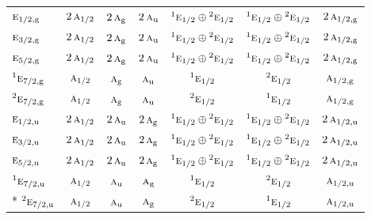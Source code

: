\documentclass[10pt,a4paper]{article}
\numberwithin{equation}{section}
\newcommand{\irr}[1]{\text{\normalfont\scshape #1}}
\newcommand{\conjpair}[1]{{}^{#1}}
\newcommand{\ptag}[1]{\mathrm{#1}}
\begin{document}
{\begin{longtable}{@{}lcccccc@{}}
$\irr{e}_{1/2,\ptag{g}}$ & $2\,\irr{a}_{1/2}$ & $2\,\irr{a}_{\ptag{g}}$ & $2\,\irr{a}_{\ptag{u}}$ & $\conjpair{1}\irr{e}_{1/2}\oplus \conjpair{2}\irr{e}_{1/2}$ & $\conjpair{1}\irr{e}_{1/2}\oplus \conjpair{2}\irr{e}_{1/2}$ & $2\,\irr{a}_{1/2,\ptag{g}}$\\
$\irr{e}_{3/2,\ptag{g}}$ & $2\,\irr{a}_{1/2}$ & $2\,\irr{a}_{\ptag{g}}$ & $2\,\irr{a}_{\ptag{u}}$ & $\conjpair{1}\irr{e}_{1/2}\oplus \conjpair{2}\irr{e}_{1/2}$ & $\conjpair{1}\irr{e}_{1/2}\oplus \conjpair{2}\irr{e}_{1/2}$ & $2\,\irr{a}_{1/2,\ptag{g}}$\\
$\irr{e}_{5/2,\ptag{g}}$ & $2\,\irr{a}_{1/2}$ & $2\,\irr{a}_{\ptag{g}}$ & $2\,\irr{a}_{\ptag{u}}$ & $\conjpair{1}\irr{e}_{1/2}\oplus \conjpair{2}\irr{e}_{1/2}$ & $\conjpair{1}\irr{e}_{1/2}\oplus \conjpair{2}\irr{e}_{1/2}$ & $2\,\irr{a}_{1/2,\ptag{g}}$\\
$\conjpair{1}\irr{e}_{7/2,\ptag{g}}$ & $\irr{a}_{1/2}$ & $\irr{a}_{\ptag{g}}$ & $\irr{a}_{\ptag{u}}$ & $\conjpair{1}\irr{e}_{1/2}$ & $\conjpair{2}\irr{e}_{1/2}$ & $\irr{a}_{1/2,\ptag{g}}$\\
$\conjpair{2}\irr{e}_{7/2,\ptag{g}}$ & $\irr{a}_{1/2}$ & $\irr{a}_{\ptag{g}}$ & $\irr{a}_{\ptag{u}}$ & $\conjpair{2}\irr{e}_{1/2}$ & $\conjpair{1}\irr{e}_{1/2}$ & $\irr{a}_{1/2,\ptag{g}}$\\
$\irr{e}_{1/2,\ptag{u}}$ & $2\,\irr{a}_{1/2}$ & $2\,\irr{a}_{\ptag{u}}$ & $2\,\irr{a}_{\ptag{g}}$ & $\conjpair{1}\irr{e}_{1/2}\oplus \conjpair{2}\irr{e}_{1/2}$ & $\conjpair{1}\irr{e}_{1/2}\oplus \conjpair{2}\irr{e}_{1/2}$ & $2\,\irr{a}_{1/2,\ptag{u}}$\\
$\irr{e}_{3/2,\ptag{u}}$ & $2\,\irr{a}_{1/2}$ & $2\,\irr{a}_{\ptag{u}}$ & $2\,\irr{a}_{\ptag{g}}$ & $\conjpair{1}\irr{e}_{1/2}\oplus \conjpair{2}\irr{e}_{1/2}$ & $\conjpair{1}\irr{e}_{1/2}\oplus \conjpair{2}\irr{e}_{1/2}$ & $2\,\irr{a}_{1/2,\ptag{u}}$\\
$\irr{e}_{5/2,\ptag{u}}$ & $2\,\irr{a}_{1/2}$ & $2\,\irr{a}_{\ptag{u}}$ & $2\,\irr{a}_{\ptag{g}}$ & $\conjpair{1}\irr{e}_{1/2}\oplus \conjpair{2}\irr{e}_{1/2}$ & $\conjpair{1}\irr{e}_{1/2}\oplus \conjpair{2}\irr{e}_{1/2}$ & $2\,\irr{a}_{1/2,\ptag{u}}$\\
$\conjpair{1}\irr{e}_{7/2,\ptag{u}}$ & $\irr{a}_{1/2}$ & $\irr{a}_{\ptag{u}}$ & $\irr{a}_{\ptag{g}}$ & $\conjpair{1}\irr{e}_{1/2}$ & $\conjpair{2}\irr{e}_{1/2}$ & $\irr{a}_{1/2,\ptag{u}}$\\*
$\conjpair{2}\irr{e}_{7/2,\ptag{u}}$ & $\irr{a}_{1/2}$ & $\irr{a}_{\ptag{u}}$ & $\irr{a}_{\ptag{g}}$ & $\conjpair{2}\irr{e}_{1/2}$ & $\conjpair{1}\irr{e}_{1/2}$ & $\irr{a}_{1/2,\ptag{u}}$\\
\bottomrule\end{longtable}}
\end{document}
